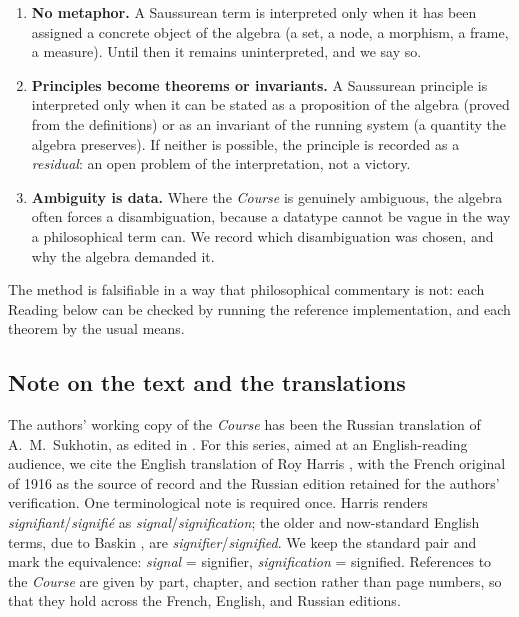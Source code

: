 \documentclass[11pt,a4paper]{article}
\theoremstyle{remark}
\begin{document}
\begin{enumerate}[leftmargin=*,nosep]
  \item \textbf{No metaphor.} A Saussurean term is interpreted only when it has
    been assigned a concrete object of the algebra (a set, a node, a morphism,
    a frame, a measure). Until then it remains uninterpreted, and we say so.
  \item \textbf{Principles become theorems or invariants.} A Saussurean
    principle is interpreted only when it can be stated as a proposition of the
    algebra (proved from the definitions) or as an invariant of the running
    system (a quantity the algebra preserves). If neither is possible, the
    principle is recorded as a \emph{residual}: an open problem of the
    interpretation, not a victory.
  \item \textbf{Ambiguity is data.} Where the \textit{Course} is genuinely
    ambiguous, the algebra often forces a disambiguation, because a datatype
    cannot be vague in the way a philosophical term can. We record which
    disambiguation was chosen, and why the algebra demanded it.
\end{enumerate}

The method is falsifiable in a way that philosophical commentary is not: each
Reading below can be checked by running the reference implementation, and each
theorem by the usual means.

\subsection{Note on the text and the translations}

The authors' working copy of the \textit{Course} has been the Russian
translation of A.~M.~Sukhotin, as edited in \cite{saussure1977}. For this
series, aimed at an English-reading audience, we cite the English translation
of Roy Harris \cite{harris1983}, with the French original of 1916
\cite{saussure1916} as the source of record and the Russian edition retained
for the authors' verification. One terminological note is required once.
Harris renders \emph{signifiant}/\emph{signifi\'e} as
\emph{signal}/\emph{signification}; the older and now-standard English terms,
due to Baskin \cite{baskin1959}, are \emph{signifier}/\emph{signified}. We keep
the standard pair and mark the equivalence: \emph{signal} = signifier,
\emph{signification} = signified. References to the \textit{Course} are given
by part, chapter, and section rather than page numbers, so that they hold
across the French, English, and Russian editions.
\end{document}
